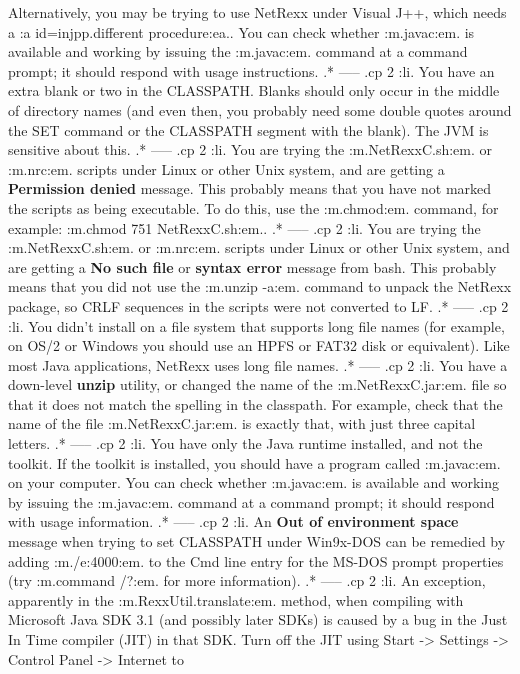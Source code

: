 Alternatively, you may be trying to use NetRexx under Visual J++, which
needs a :a id=injpp.different procedure:ea..
You can check whether :m.javac:em. is available and working by issuing
the :m.javac:em. command at a command prompt; it should respond with
usage instructions.
.* -----
.cp 2
:li.
You have an extra blank or two in the CLASSPATH.  Blanks should only
occur in the middle of directory names (and even then, you probably need
some double quotes around the SET command or the CLASSPATH segment with
the blank).  The JVM is sensitive about this.
.* -----
.cp 2
:li.
You are trying the :m.NetRexxC.sh:em. or :m.nrc:em. scripts under
Linux or other Unix system, and are getting a \textbf{Permission denied}
message.  This probably means that you have not marked the scripts as
being executable.  To do this, use the :m.chmod:em. command, for
example: :m.chmod 751 NetRexxC.sh:em..
.* -----
.cp 2
:li.
You are trying the :m.NetRexxC.sh:em. or :m.nrc:em. scripts under
Linux or other Unix system, and are getting a \textbf{No such file} or
\textbf{syntax error} message from bash.  This probably means that you
did not use the :m.unzip -a:em. command to unpack the NetRexx package,
so CRLF sequences in the scripts were not converted to LF.
.* -----
.cp 2
:li.
You didn't install on a file system that supports long file names (for
example, on OS/2 or Windows you should use an HPFS or FAT32 disk or
equivalent).  Like most Java applications, NetRexx uses long file names.
.* -----
.cp 2
:li.
You have a down-level \textbf{unzip} utility, or changed the name of
the :m.NetRexxC.jar:em. file so that it does not match the spelling in
the classpath.  For example, check that the name of the file
:m.NetRexxC.jar:em. is exactly that, with just three capital
letters.
.* -----
.cp 2
:li.
You have only the Java runtime installed, and not the toolkit.  If the
toolkit is installed, you should have a program called :m.javac:em. on your
computer.
You can check whether :m.javac:em. is available and working by issuing
the :m.javac:em. command at a command prompt; it should respond with
usage information.
.* -----
.cp 2
:li.
An \textbf{Out of environment space} message when trying to set CLASSPATH
under Win9x-DOS can be remedied by adding :m./e:4000:em. to the Cmd
line entry for the MS-DOS prompt properties (try :m.command /?:em.
for more information).
.* -----
.cp 2
:li.
An exception, apparently in the :m.RexxUtil.translate:em. method, when
compiling with Microsoft Java SDK 3.1 (and possibly later SDKs) is
caused by a bug in the Just In Time compiler (JIT) in that SDK.
Turn off the JIT using Start -> Settings -> Control Panel -> Internet to
